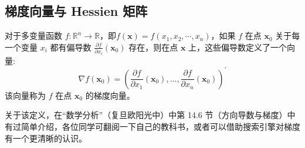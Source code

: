 \documentclass[cn]{elegantpaper}
\begin{document}
\subsection{梯度向量与 Hessien 矩阵}

\begin{definition}[梯度向量]
    对于多变量函数 $f:\mathbb{R}^{n}\rightarrow\mathbb{R}$，即$f(\mathbf{x})=f\left(x_{1},x_{2},\cdots,x_{n}\right)$，如果 $f$ 在点 $\mathbf{x}_{0}$ 关于每一个变量 $x_{i}$ 都有偏导数 $\frac{\partial f}{\partial x_{i}}(\mathbf{x}_{0})$ 存在，则在点 $\mathbf{x}$ 上，这些偏导数定义了一个向量:
    \begin{equation}
        \nabla f(\mathbf{x}_{0})=\left(\frac{\partial f}{\partial x_{1}}(\mathbf{x}_{0}),\ldots,\frac{\partial f}{\partial x_{n}}(\mathbf{x}_{0})\right)^{\prime}
    \end{equation}
    该向量称为 $f$ 在点 $\mathbf{x}_{0}$ 的梯度向量。
\end{definition}

\begin{remark}
    关于该定义，在“数学分析”（复旦欧阳光中）中第 14.6 节（方向导数与梯度）中有过简单介绍，各位同学可翻阅一下自己的教科书，或者可以借助搜索引擎对梯度有一个更清晰的认识。
\end{remark}
\end{document}
